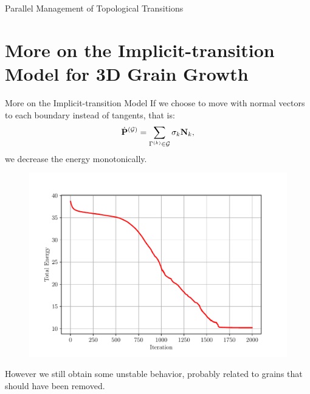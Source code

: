 \documentclass[usenames,dvipsnames]{beamer}
\begin{document}
\begin{frame}{Parallel Management of Topological Transitions}

\end{frame}

\section[3D Implicit-transition Model]{More on the Implicit-transition Model for 3D Grain Growth}

\begin{frame}{More on the Implicit-transition Model}
If we choose to move with normal vectors to each boundary instead of tangents, that is:
%
\begin{equation*}
    \dot{\mathbf{P}}^{(\mathcal{G})} = \sum_{\Gamma^{(k)} \in \mathcal{G}} \sigma_k \mathbf{N}_k,
\end{equation*}
%
we decrease the energy monotonically.
\begin{figure}
    \centering
    \includegraphics[trim={0 1em 0 3em},clip=true,scale=0.4]{figures/3d_voronoi/3D_energy2.pdf}
\end{figure}
\vspace{-1em}
However we still obtain some unstable behavior, probably related to grains that should have been removed.
\end{frame}
\end{document}
